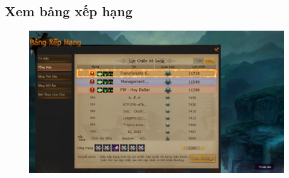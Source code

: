 \documentclass[3p]{elsarticle}
\begin{document}
\subsection{Xem bảng xếp hạng}
\begin{figure}[!htbp]
	\centering
	\includegraphics[scale=.3]{images/view_leaderboard.pdf}
\end{figure}
\end{document}
